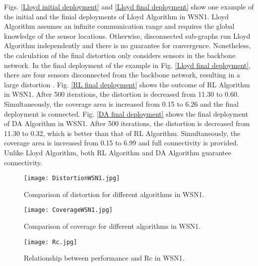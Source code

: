 \documentclass[journal,draftcls,onecolumn,12pt,twoside, narroweqnarray]{IEEEtran}
\begin{document}
Figs. \ref{Lloyd initial deployment} and \ref{Lloyd final deployment} show one example of the initial and the finial deployments of Lloyd Algorithm in WSN1. Lloyd Algorithm assumes an  infinite communication range and requires the global knowledge of the sensor locations. Otherwise, disconnected sub-graphs run Lloyd Algorithm independently and there is no guarantee for convergence. Nonetheless, the calculation of the final distortion only considers sensors in the backbone network. In the final deployment of the example in Fig. \ref{Lloyd final deployment}, there are four sensors disconnected from the backbone network, resulting in a large distortion .
Fig. \ref{RL final deployment} shows the outcome of RL Algorithm in WSN1. After 500 iterations, the distortion is decreased from 11.30 to 0.60. Simultaneously, the coverage area is increased from 0.15 to 6.26 and the final deployment is connected.
Fig. \ref{DA final deployment} shows the final deployment of DA Algorithm in WSN1. After 500 iterations, the distortion is decreased from 11.30 to 0.32, which is better than that of RL Algorithm. Simultaneously, the coverage area is increased from 0.15 to 6.99 and full connectivity is provided. Unlike Lloyd Algorithm, both RL Algorithm and DA Algorithm guarantee connectivity.

\begin{figure}[!t]
\centering
\texttt{[image: DistortionWSN1.jpg]}
\caption{Comparison of distortion for different algorithms in WSN1.}
\label{distortion in homogeneous sensor network}
\end{figure}
\begin{figure}[!t]
\centering
\texttt{[image: CoverageWSN1.jpg]}
\caption{Comparison of coverage for different algorithms in WSN1.}
\label{coverage in homogeneous sensor network}
\end{figure}


\begin{figure}[!t]
\centering
\texttt{[image: Rc.jpg]}
\setlength{\belowcaptionskip}{-10pt} \caption{Relationship between performance and Rc in WSN1.}
\label{relationship between distortion, coverage and Rc}
\end{figure}
\end{document}
